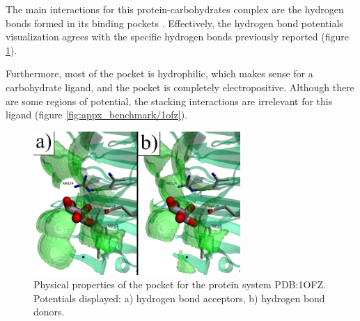       The main interactions for this protein-carbohydrates complex are the hydrogen bonds formed in its binding pockets \cite{hbonds_2023}. Effectively, the hydrogen bond potentials visualization agrees with the specific hydrogen bonds previously reported (figure \ref{fig:benchmark/1ofz}).

      Furthermore, most of the pocket is hydrophilic, which makes sense for a carbohydrate ligand, and the pocket is completely electropositive. Although there are some regions of potential, the stacking interactions are irrelevant for this ligand (figure \ref{fig:appx_benchmark/1ofz}).

      \begin{figure}[H]
        \centering
        \includegraphics[width=0.7\textwidth]{figures/results/benchmark_prot/1ofz.png}
        \caption{\label{fig:benchmark/1ofz} Physical properties of the pocket for the protein system PDB:1OFZ. Potentials displayed: a) hydrogen bond acceptors, b) hydrogen bond donors.}
      \end{figure}
    \pagebreak

